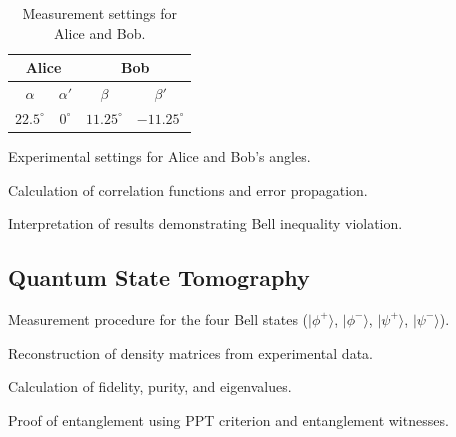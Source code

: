 \begin{table}[h!]
    \centering
    \begin{tabular}{|c|c|c|c|}
        \hline
        \multicolumn{2}{|c|}{Alice} & \multicolumn{2}{c|}{Bob} \\ \hline
        $\alpha$ & $\alpha'$ & $\beta$ & $\beta'$ \\ \hline
        $22.5^\circ$ & $0^\circ$ & $11.25^\circ$ & $-11.25^\circ$ \\ \hline
    \end{tabular}
    \caption{Measurement settings for Alice and Bob.}
    \label{tab:measurement_settings}
\end{table}



Experimental settings for Alice and Bob’s angles.

Calculation of correlation functions and error propagation.

Interpretation of results demonstrating Bell inequality violation.

\subsection{Quantum State Tomography}
Measurement procedure for the four Bell states (\(|\phi^+\rangle\), \(|\phi^-\rangle\), \(|\psi^+\rangle\), \(|\psi^-\rangle\)).

Reconstruction of density matrices from experimental data.

Calculation of fidelity, purity, and eigenvalues.

Proof of entanglement using PPT criterion and entanglement witnesses.